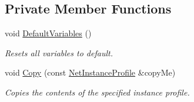 \subsection*{Private Member Functions}
\begin{DoxyCompactItemize}
\item 
\hypertarget{class_net_instance_profile_a0b2533bc5540e7beb22abf25fb18dcc1}{
void \hyperlink{class_net_instance_profile_a0b2533bc5540e7beb22abf25fb18dcc1}{DefaultVariables} ()}
\label{class_net_instance_profile_a0b2533bc5540e7beb22abf25fb18dcc1}

\begin{DoxyCompactList}\small\item\em Resets all variables to default. \item\end{DoxyCompactList}\item 
void \hyperlink{class_net_instance_profile_a06dc28fba6ad7f3f9e91fe37b475f31f}{Copy} (const \hyperlink{class_net_instance_profile}{NetInstanceProfile} \&copyMe)
\begin{DoxyCompactList}\small\item\em Copies the contents of the specified instance profile. \item\end{DoxyCompactList}\end{DoxyCompactItemize}
